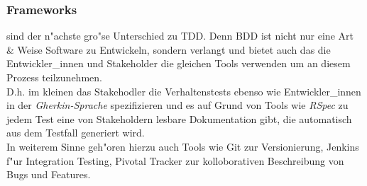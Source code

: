     \subsubsection{Frameworks} sind der n"achste gro"se Unterschied zu TDD. Denn 
      BDD ist nicht nur eine Art \& Weise Software zu Entwickeln, sondern verlangt
      und bietet auch das die Entwickler\_innen und Stakeholder die gleichen
      Tools verwenden um an diesem Prozess teilzunehmen.\\
      D.h. im kleinen das Stakehodler die Verhaltenstests ebenso wie 
      Entwickler\_innen in der {\em Gherkin-Sprache } spezifizieren und es 
      auf Grund von Tools wie {\em RSpec } zu jedem Test eine von Stakeholdern
      lesbare Dokumentation gibt, die automatisch aus dem Testfall generiert wird.\\
      In weiterem Sinne geh"oren hierzu auch Tools wie Git zur Versionierung, 
      Jenkins f"ur Integration Testing, Pivotal Tracker zur kolloborativen 
      Beschreibung von Bugs und Features. 

